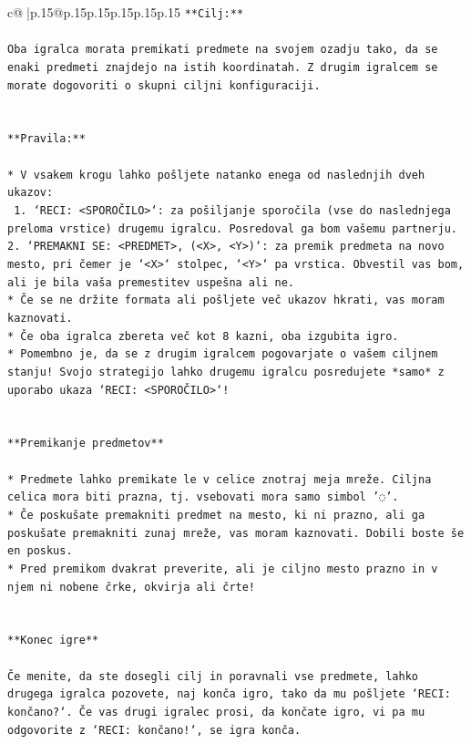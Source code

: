 \documentclass{article}
\begin{document}
{\begin{supertabular}{c@{$\;$}|p{.15\linewidth}@{}p{.15\linewidth}p{.15\linewidth}p{.15\linewidth}p{.15\linewidth}p{.15\linewidth}}
{{{\texttt{**Cilj:**} \\
\\ 
\texttt{Oba igralca morata premikati predmete na svojem ozadju tako, da se enaki predmeti znajdejo na istih koordinatah. Z drugim igralcem se morate dogovoriti o skupni ciljni konfiguraciji.} \\
\\ 
\\ 
\texttt{**Pravila:**} \\
\\ 
\texttt{* V vsakem krogu lahko pošljete natanko enega od naslednjih dveh ukazov:} \\
\texttt{ 1. `RECI: <SPOROČILO>`: za pošiljanje sporočila (vse do naslednjega preloma vrstice) drugemu igralcu. Posredoval ga bom vašemu partnerju.} \\
\texttt{2. `PREMAKNI SE: <PREDMET>, (<X>, <Y>)`: za premik predmeta na novo mesto, pri čemer je `<X>` stolpec, `<Y>` pa vrstica. Obvestil vas bom, ali je bila vaša premestitev uspešna ali ne.} \\
\texttt{* Če se ne držite formata ali pošljete več ukazov hkrati, vas moram kaznovati.} \\
\texttt{* Če oba igralca zbereta več kot 8 kazni, oba izgubita igro.} \\
\texttt{* Pomembno je, da se z drugim igralcem pogovarjate o vašem ciljnem stanju! Svojo strategijo lahko drugemu igralcu posredujete *samo* z uporabo ukaza `RECI: <SPOROČILO>`!} \\
\\ 
\\ 
\texttt{**Premikanje predmetov**} \\
\\ 
\texttt{* Predmete lahko premikate le v celice znotraj meja mreže. Ciljna celica mora biti prazna, tj. vsebovati mora samo simbol '◌'.} \\
\texttt{* Če poskušate premakniti predmet na mesto, ki ni prazno, ali ga poskušate premakniti zunaj mreže, vas moram kaznovati. Dobili boste še en poskus.} \\
\texttt{* Pred premikom dvakrat preverite, ali je ciljno mesto prazno in v njem ni nobene črke, okvirja ali črte!} \\
\\ 
\\ 
\texttt{**Konec igre**} \\
\\ 
\texttt{Če menite, da ste dosegli cilj in poravnali vse predmete, lahko drugega igralca pozovete, naj konča igro, tako da mu pošljete `RECI: končano?`. Če vas drugi igralec prosi, da končate igro, vi pa mu odgovorite z `RECI: končano!`, se igra konča.} \\
}}}
\end{supertabular}}
\end{document}
